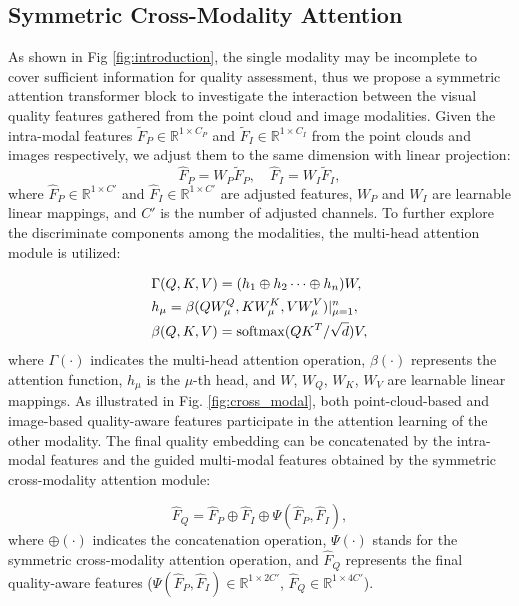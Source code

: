 \documentclass{article}
\begin{document}
\subsection{Symmetric Cross-Modality Attention}
As shown in Fig \ref{fig:introduction}, the single modality may be incomplete to cover sufficient information for quality assessment, thus we propose a symmetric attention transformer block to investigate the interaction between the visual quality features gathered from the point cloud and image modalities. Given the intra-modal features $\widetilde{F}_{P}  \in \mathbb{R}^{1 \times C_{P}}$ and $\widetilde{F}_{I}  \in \mathbb{R}^{1 \times C_{I}}$ from the point clouds and images respectively, we adjust them to the same dimension with linear projection:
\begin{equation}
     \hat{F}_{P} = W_{P}\widetilde{F}_{P}, \quad \hat{F}_{I} = W_{I}\widetilde{F}_{I},
\end{equation}
where $\hat{F}_{P} \in \mathbb{R}^{1 \times C'}$ and $\hat{F}_{I} \in \mathbb{R}^{1 \times C'} $ are adjusted features, $W_{P}$ and $W_{I}$ are learnable linear mappings, and $C'$ is the number of adjusted channels. To further explore the discriminate components among the modalities, the multi-head attention module is utilized:

\begin{equation}
\begin{aligned}
     & \Gamma (Q,K,V) = (h_{1} \oplus h_{2} \cdots \oplus h_{n}) W, \\
     & h_{\mu} = \beta(QW_{\mu}^{Q},KW_{\mu}^{K},VW_{\mu}^{V})|_{\mu=1}^n,\\
     &\beta(Q,K,V) = {\rm softmax}(QK^{T}/\sqrt{d})V, \\
\end{aligned} 
\end{equation}
where $\Gamma(\cdot)$ indicates the multi-head attention operation, $\beta(\cdot)$ represents the attention function, $h_{\mu}$ is the $\mu$-th head, and $W$, $W_{Q}$, $W_{K}$, $W_{V}$ are learnable linear mappings. As illustrated in Fig. \ref{fig:cross_modal}, both point-cloud-based and image-based quality-aware features participate in the attention learning of the other modality. The final quality embedding can be concatenated by the intra-modal features and the guided multi-modal features obtained by the symmetric cross-modality attention module:

\begin{equation}
    \hat{F}_{Q} = \hat{F}_{P} \oplus \hat{F}_{I} \oplus \Psi(\hat{F}_{P},\hat{F}_{I}),
\end{equation}
where $\oplus(\cdot)$ indicates the concatenation operation, $\Psi(\cdot)$ stands for the symmetric cross-modality attention operation, and $\hat{F}_{Q}$ represents the final quality-aware features ($\Psi(\hat{F}_{P},\hat{F}_{I}) \in \mathbb{R}^{1 \times 2C'}$, $\hat{F}_{Q} \in \mathbb{R}^{1 \times 4C'}$).
\end{document}

